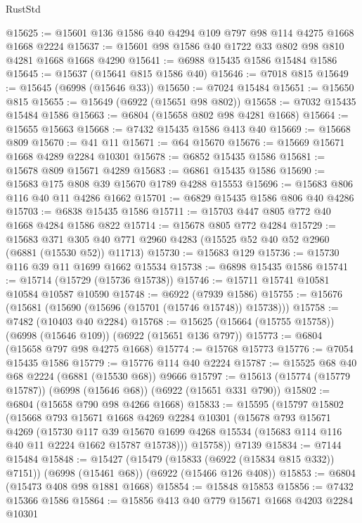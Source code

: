 \begin{lexlean}{RustStd}
\begin{coremodule}
@15625 := @15601 @136 @1586 @40 @4294 @109 @797 @98 @114 @4275 @1668 @1668 @2224
@15637 := @15601 @98 @1586 @40 @1722 @33 @802 @98 @810 @4281 @1668 @1668 @4290
@15641 := @6988 @15435 @1586 @15484 @1586
@15645 := @15637 (@15641 @815 @1586 @40)
@15646 := @7018 @815
@15649 := @15645 (@6998 (@15646 @33))
@15650 := @7024 @15484
@15651 := @15650 @815
@15655 := @15649 (@6922 (@15651 @98 @802))
@15658 := @7032 @15435 @15484 @1586
@15663 := @6804 (@15658 @802 @98 @4281 @1668)
@15664 := @15655 @15663
@15668 := @7432 @15435 @1586 @413 @40
@15669 := @15668 @809
@15670 := @41 @11
@15671 := @64 @15670
@15676 := @15669 @15671 @1668 @4289 @2284 @10301
@15678 := @6852 @15435 @1586
@15681 := @15678 @809 @15671 @4289
@15683 := @6861 @15435 @1586
@15690 := @15683 @175 @808 @39 @15670 @1789 @4288 @15553
@15696 := @15683 @806 @116 @40 @11 @4286 @1662
@15701 := @6829 @15435 @1586 @806 @40 @4286
@15703 := @6838 @15435 @1586
@15711 := @15703 @447 @805 @772 @40 @1668 @4284 @1586 @822
@15714 := @15678 @805 @772 @4284
@15729 := @15683
    @371
    @305
    @40
    @771
    @2960
    @4283
    (@15525 @52 @40 @52 @2960 (@6881 (@15530 @52)) @11713)
@15730 := @15683 @129
@15736 := @15730 @116 @39 @11 @1699 @1662 @15534
@15738 := @6898 @15435 @1586
@15741 := @15714 (@15729 (@15736 @15738))
@15746 := @15711 @15741 @10581 @10584 @10587 @10590
@15748 := @6922 (@7939 @1586)
@15755 := @15676 (@15681 (@15690 (@15696 (@15701 (@15746 @15748)) @15738)))
@15758 := @7482 (@10403 @40 @2284)
@15768 := @15625 (@15664 (@15755 @15758)) (@6998 (@15646 @109)) (@6922 (@15651 @136 @797))
@15773 := @6804 (@15658 @797 @98 @4275 @1668)
@15774 := @15768 @15773
@15776 := @7054 @15435 @1586
@15779 := @15776 @114 @40 @2224
@15787 := @15525 @68 @40 @68 @2224 (@6881 (@15530 @68)) @9666
@15797 := @15613 (@15774 (@15779 @15787)) (@6998 (@15646 @68)) (@6922 (@15651 @331 @790))
@15802 := @6804 (@15658 @790 @98 @4266 @1668)
@15833 := @15595
    (@15797
      @15802
      (@15668
        @793
        @15671
        @1668
        @4269
        @2284
        @10301
        (@15678
          @793
          @15671
          @4269
          (@15730
            @117
            @39
            @15670
            @1699
            @4268
            @15534
            (@15683 @114 @116 @40 @11 @2224 @1662 @15787 @15738)))
        @15758))
    @7139
@15834 := @7144 @15484
@15848 := @15427
    (@15479 (@15833 (@6922 (@15834 @815 @332)) @7151))
    (@6998 (@15461 @68))
    (@6922 (@15466 @126 @408))
@15853 := @6804 (@15473 @408 @98 @1881 @1668)
@15854 := @15848 @15853
@15856 := @7432 @15366 @1586
@15864 := @15856 @413 @40 @779 @15671 @1668 @4203 @2284 @10301

\end{coremodule}
\end{lexlean}
